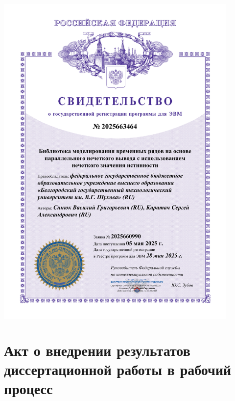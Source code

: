 \includegraphics[width=0.9\textwidth, page=1]{images/RosPatent2.pdf}

\chapter{Акт о внедрении результатов диссертационной работы в рабочий процесс}\label{app:C}

%
